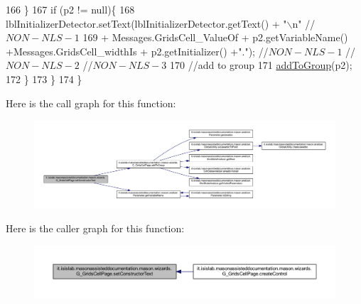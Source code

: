 \begin{DoxyCode}
166             \}
167             \textcolor{keywordflow}{if} (p2 != null)\{    
168                 lblInitializerDetector.setText(lblInitializerDetector.getText() + \textcolor{stringliteral}{"\(\backslash\)n"} \textcolor{comment}{//$NON-NLS-1$}
169                     +  Messages.GridsCell\_ValueOf + p2.getVariableName() +Messages.GridsCell\_widthIs + 
      p2.getInitializer() +\textcolor{stringliteral}{"."}); \textcolor{comment}{//$NON-NLS-1$ //$NON-NLS-2$ //$NON-NLS-3$}
170                 \textcolor{comment}{//add to group}
171                 \hyperlink{classit_1_1isislab_1_1masonassisteddocumentation_1_1mason_1_1wizards_1_1_g___grids_cell_page_a874d5aab262342b54eb0bd9ea0e576ab}{addToGroup}(p2);
172             \}           
173         \}
174     \}
\end{DoxyCode}


Here is the call graph for this function\-:
\nopagebreak
\begin{figure}[H]
\begin{center}
\leavevmode
\includegraphics[width=350pt]{classit_1_1isislab_1_1masonassisteddocumentation_1_1mason_1_1wizards_1_1_g___grids_cell_page_ad9069cbfc289b5549376270b2bc35c21_cgraph}
\end{center}
\end{figure}




Here is the caller graph for this function\-:
\nopagebreak
\begin{figure}[H]
\begin{center}
\leavevmode
\includegraphics[width=350pt]{classit_1_1isislab_1_1masonassisteddocumentation_1_1mason_1_1wizards_1_1_g___grids_cell_page_ad9069cbfc289b5549376270b2bc35c21_icgraph}
\end{center}
\end{figure}




